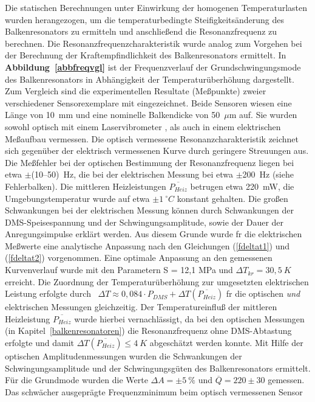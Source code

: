 Die statischen Berechnungen unter Einwirkung der homogenen Temperaturlasten
wurden herangezogen, um die temperaturbedingte Steifigkeitsänderung des
Balkenresonators zu ermitteln und anschließend die Resonanzfrequenz
zu berechnen. Die Resonanzfrequenzcharakteristik wurde analog zum
Vorgehen bei der Berechnung der Kraftempfindlichkeit des Balkenresonators
ermittelt. In {\bf Abbildung~\ref{abbfreqvgl}} ist der Frequenzverlauf
der Grundschwingungsmode des Balkenresonators in Abhängigkeit der
Temperaturüberhöhung dargestellt. Zum Vergleich sind die experimentellen
Resultate (Meßpunkte) zweier verschiedener Sensorexemplare mit
eingezeichnet. Beide Sensoren wiesen eine Länge von 10~mm und eine
nominelle Balkendicke von 50~$\mu$m auf. Sie wurden sowohl optisch mit
einem Laservibrometer \cite{Mes93}, als auch in einem
elektrischen Meßaufbau \cite{Wie93} vermessen. Die optisch vermessene
Resonanzcharakteristik zeichnet sich gegenüber der elektrisch vermessenen
Kurve durch geringere Streuungen aus. Die Meßfehler bei der optischen
Bestimmung der Resonanzfrequenz liegen bei etwa $\pm$(10--50)~Hz, die bei
der elektrischen Messung bei etwa $\pm$200~Hz (siehe Fehlerbalken).
Die mittleren Heizleistungen $\overline{P_{Heiz}}$ betrugen etwa 220~mW,
die Umgebungstemperatur wurde auf etwa $\pm 1~^{\circ}C$ konstant gehalten.
Die großen Schwankungen bei der elektrischen Messung können durch
Schwankungen der DMS-Speisespannung und der Schwingungsamplitude, sowie
der Dauer der Anregungsimpulse erklärt werden.
Aus diesem Grunde wurde fr die elektrischen Meßwerte eine analytische
Anpassung nach den Gleichungen (\ref{fdeltat1}) und (\ref{fdeltat2})
vorgenommen. Eine optimale Anpassung an den gemessenen Kurvenverlauf
wurde mit den Parametern S = 12,1 MPa und $\Delta T_{kr} = 30,5~K$
erreicht. Die Zuordnung der Temperaturüberhöhung zur umgesetzten
elektrischen Leistung erfolgte durch \,
$\Delta T \approx 0,084 \cdot P_{DMS} + \Delta T(\overline{P_{Heiz}})$
fr die optischen {\em und} elektrischen Messungen gleichzeitig.
Der Temperatureinfluß der mittleren Heizleistung $\overline{P_{Heiz}}$
wurde hierbei vernachlässigt, da bei den optischen Messungen (in
Kapitel~\ref{balkenresonatoren}) die Resonanzfrequenz ohne DMS-Abtastung
erfolgte
und damit $\Delta T(\overline{P_{Heiz}}) \leq 4~K$ abgeschätzt werden konnte.
Mit Hilfe der optischen Amplitudenmessungen wurden die Schwankungen
der Schwingungsamplitude und der Schwingungsgüten des Balkenresonators
ermittelt. Für die Grundmode wurden die Werte
$\Delta A = \pm5~\%$ und $\overline{Q} = 220\pm30$ gemessen.
Das schwächer ausgeprägte Frequenzminimum beim optisch vermessenen Sensor
